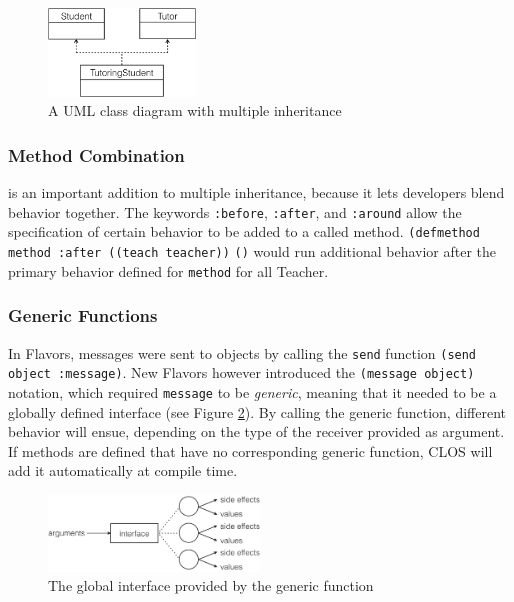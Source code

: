 \documentclass[oribibl]{llncs}
\begin{document}
\begin{figure}[]
    \centering
    \includegraphics[width=0.35\textwidth]{images/multipleinheritance2.png}
    \caption{A UML class diagram with multiple inheritance}
    \label{fig:multipleinheritance}
\end{figure}

\subsubsection{Method Combination}
\label{sec:metcom}
is an important addition to multiple inheritance, because it lets developers blend behavior together. The keywords \texttt{:before}, \texttt{:after}, and \texttt{:around} allow the specification of certain behavior to be added to a called method. \texttt{(defmethod method :after}\texttt{ ((teach teacher))}
    \texttt{()} would run additional behavior after the primary behavior defined for \texttt{method} for all Teacher. 


\subsubsection{Generic Functions}
\label{sec:genfun}
In Flavors, messages were sent to objects by calling the \texttt{send} function \texttt{(send object :message)}. New Flavors however introduced the \texttt{(message object)} notation, which required \texttt{message} to be \emph{generic}, meaning that it needed to be a globally defined interface (see Figure \ref{fig:genericfunction}). By calling the generic function, different behavior will ensue, depending on the type of the receiver provided as argument. If methods are defined that have no corresponding generic function, CLOS will add it automatically at compile time.


\begin{figure}[]
    \centering
    \includegraphics[width=0.5\textwidth]{images/genericfunction.png}
    \caption{The global interface provided by the generic function}
    \label{fig:genericfunction}
\end{figure}
\end{document}
